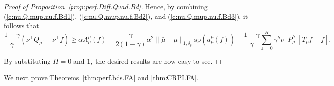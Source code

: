 \documentclass[twoside]{article}
\theoremstyle{plain}
\theoremstyle{definition}
\theoremstyle{remark}
\renewcommand{\sp}{\mathrm{sp}}
\newcommand{\tr}{\top}
\newcommand{\mup}{\mu'}
\newcommand{\mub}{\bar{\mu}}
\renewcommand{\eqref}[1]{(\ref{#1})}
\begin{document}
\begin{proof}[Proof of Proposition~\ref{prop:perf.Diff.Quad.Bd}]
    Hence, by combining \eqref{e:nu.Q.mup.nu.f.Bd1}, \eqref{e:nu.Q.mup.nu.f.Bd2}, and \eqref{e:nu.Q.mup.nu.f.Bd3}, it follows that
    \begin{equation}
     \frac{1-\gamma}{\gamma} (\nu^\tr Q_{\mup}  - \nu^\tr f) 
    \ge \alpha A_{\mu}^{\mub}(f) - \frac{\gamma}{2(1 - \gamma)} \alpha^2 \|\mub - \mu\|_{1, \delta_\mu} \sp(a_{\mu}^{\mub}(f))  + \frac{1 - \gamma}{\gamma} \sum_{h = 0}^H \gamma^h \nu^\tr P_{\mup}^h [T_{\mu}f - f].
    \end{equation}

    By substituting $H  =0$ and $1,$ the desired results are now easy to see.
\end{proof}

We next prove Theorems~\ref{thm:perf.bds.FA} and \ref{thm:CRPI.FA}.
\end{document}
